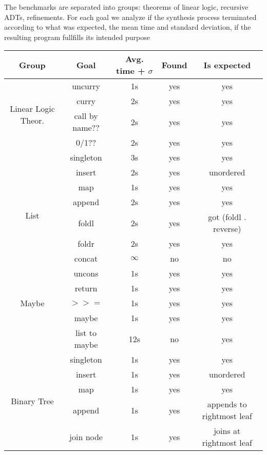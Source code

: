 \documentclass{llncs}
\begin{document}
The benchmarks are separated into groups: theorems of linear logic, recursive
ADTs, refinements. For each goal we analyze if the synthesis process terminated
according to what was expected, the mean time and standard deviation, if the
resulting program fullfills its intended purpose


\begin{center}
    \begin{tabular}{ |c|c|c|c|c| }
        \hline
        Group & Goal & Avg. time + $\sigma$ & Found & Is expected \\
        \hline
        \multirow{4}{4em}{Linear Logic Theor.} & uncurry & 1s & yes & yes \\ 
        & curry & 2s & yes & yes \\ 
        & call by name?? & 2s & yes & yes \\ 
        & 0/1?? & 2s & yes & yes \\ 
        \hline
        \multirow{8}{4em}{List} & singleton & 3s & yes & yes \\ 
        & insert & 2s & yes & unordered \\ 
        & map & 1s & yes & yes \\ 
        & append & 2s & yes & yes \\ 
        & foldl & 2s & yes & got (foldl . reverse) \\ 
        & foldr & 2s & yes & yes \\ 
        & concat & $\infty$ & no & no \\ 
        & uncons & 1s & yes & yes \\
        \hline
        \multirow{3}{4em}{Maybe} & return & 1s & yes & yes \\ 
        & $>>=$ & 1s & yes & yes \\
        & maybe & 1s & yes & yes \\
        & list to maybe & 12s & no & yes \\
        \hline
        \multirow{5}{4em}{Binary Tree} & singleton & 1s & yes & yes \\ 
        & insert & 1s & yes & unordered \\
        & map & 1s & yes & yes \\
        & append & 1s & yes & appends to rightmost leaf \\
        & join node & 1s & yes & joins at rightmost leaf \\
        \hline

\end{tabular}
\end{center}
\end{document}
